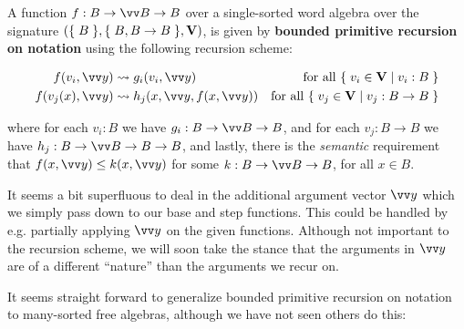 


\begin{specification} A function $f : B \rightarrow \vect{B} \rightarrow B$
over a single-sorted word algebra over the signature ${\mathopen{}\left({\mathopen{}\left\{\mathrel{}{B}\mathrel{}\right\}\mathclose{},\mathopen{}\left\{\mathrel{}{B, B
\rightarrow B}\mathrel{}\right\}\mathclose{},\mathbf{V}}\right)\mathclose{}}$, is given by \textbf{bounded primitive recursion on
notation} using the following recursion scheme:

\begin{align}
%
f\p{v_i, \vect{y}} &\leadsto g_i\p{v_i, \vect{y}} & \text{for all $\set{v_i \in
\mathbf{V} \st{ v_i : B}}$} \\
%
f\p{v_j\p{x}, \vect{y}} &\leadsto h_j\p{x, \vect{y}, f\p{x, \vect{y}}} &
\text{for all $\set{v_j \in \mathbf{V} \st{ v_j : B \rightarrow B}}$}
%
\end{align}

where for each $v_i : B$ we have $g_i : B \rightarrow \vect{B} \rightarrow B$,
and for each $v_j : B \rightarrow B$ we have $h_j : B \rightarrow \vect{B}
\rightarrow B \rightarrow B$, and lastly, there is the \emph{semantic}
requirement that $f\p{x,\vect{y}} \leq k\p{x,\vect{y}}$ for some $k : B
\rightarrow \vect{B} \rightarrow B$, for all $x \in B$.

\end{specification}

\begin{remark} It seems a bit superfluous to deal in the additional argument
vector $\vect{y}$ which we simply pass down to our base and step functions.
This could be handled by e.g. partially applying $\vect{y}$ on the given
functions.  Although not important to the recursion scheme, we will soon take
the stance that the arguments in $\vect{y}$ are of a different ``nature'' than
the arguments we recur on.\end{remark}

It seems straight forward to generalize bounded primitive recursion on notation
to many-sorted free algebras, although we have not seen others do this:

